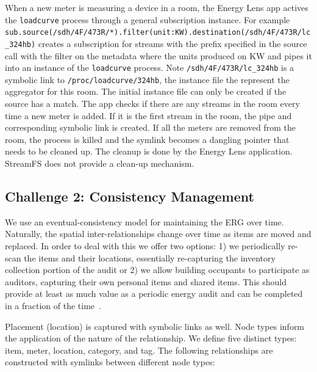 When a new meter is measuring a device in a room, the Energy Lens app actives the \texttt{loadcurve} process through a general
subscription instance.  For example\\ \texttt{sub.source(/sdh/4F/473R/*).filter(unit:KW).destination(/sdh/4F/473R/lc\_324hb)}
creates a subscription for streams with the prefix specified in the source call with the filter on the metadata where 
the units produced on KW and pipes it into an instance of the \texttt{loadcurve} process.  Note \texttt{/sdh/4F/473R/lc\_324hb}
is a symbolic link to \texttt{/proc/loadcurve/324hb}, the instance file the represent the aggregator for this room.
The initial instance file can only be created if the source has a match.  The app checks if there are any streams in the room
every time a new meter is added.  If it is the first stream in the room, the pipe and corresponding symbolic link is created. 
If all the meters are removed from the room, the process is killed and the symlink becomes a dangling pointer that needs to
be cleaned up.  The cleanup is done by the Energy Lens application.  StreamFS does not provide a clean-up mechanism.



\subsection{Challenge 2: Consistency Management}
We use an eventual-consistency model for maintaining the ERG over time.  Naturally, the spatial inter-relationships
change over time as items are moved and replaced.  In order to deal with this we offer two options: 1) we periodically
re-scan the items and their locations, essentially re-capturing the inventory collection portion of the audit or
2) we allow building occupants to participate as auditors, capturing their own personal items and shared items.
This should provide at least as much value as a periodic energy audit and can be completed in a fraction of the 
time~\cite{aceee_mobileaudit}.

Placement (location) is captured with symbolic links as well.
Node types inform the application of the nature of the relationship.  We define five distinct types: item, meter, 
location, category, and tag.  The following relationships are constructed with symlinks between different node types:

